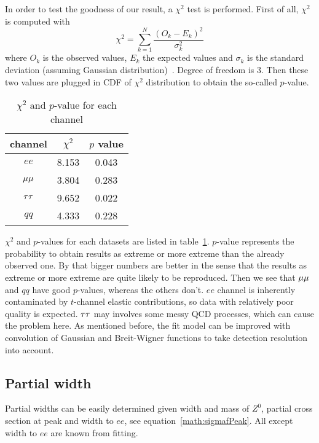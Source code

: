 In order to test the goodness of our result, a $\chi^2$ test is performed. First of all, $\chi^2$ is computed with
\begin{equation}
	\chi^2 = \sum_{k=1}^N \frac{(O_k - E_k)^2}{\sigma_k^2}
\end{equation}
where $O_k$ is the observed values, $E_k$ the expected values and $\sigma_k$ is the standard deviation (assuming Gaussian distribution)~\cite{stats}. Degree of freedom is $3$. Then these two values are plugged in CDF of $\chi^2$ distribution to obtain the so-called $p$-value.

\begin{table}[ht]
	\centering
	\begin{tabular}{ccc}
		\toprule
		channel & $\chi^2$ & $p$ value \\
		\midrule
		$ee$  & \num{8.153} & \num{0.043} \\
		$\mu\mu$ & \num{3.804} & \num{0.283} \\
		$\tau\tau$ & \num{9.652} & \num{0.022} \\
		$qq$ & \num{4.333} & \num{0.228} \\
		\bottomrule
	\end{tabular}
	\caption{$\chi^2$ and $p$-value for each channel}
	\label{tab:chi2}
\end{table}

$\chi^2$ and $p$-values for each datasets are listed in table~\ref{tab:chi2}. $p$-value represents the probability to obtain results as extreme or more extreme than the already observed one. By that bigger numbers are better in the sense that the results as extreme or more extreme are quite likely to be reproduced. Then we see that $\mu\mu$ and $qq$ have good $p$-values, whereas the others don't. $ee$ channel is inherently contaminated by $t$-channel elastic contributions, so data with relatively poor quality is expected. $\tau\tau$ may involves some messy QCD processes, which can cause the problem here. As mentioned before, the fit model can be improved with convolution of Gaussian and Breit-Wigner functions to take detection resolution into account. 

\subsection{Partial width}
Partial widths can be easily determined given width and mass of $Z^0$, partial cross section at peak and width to $ee$, see equation~\ref{math:sigmafPeak}. All except width to $ee$ are known from fitting. 

